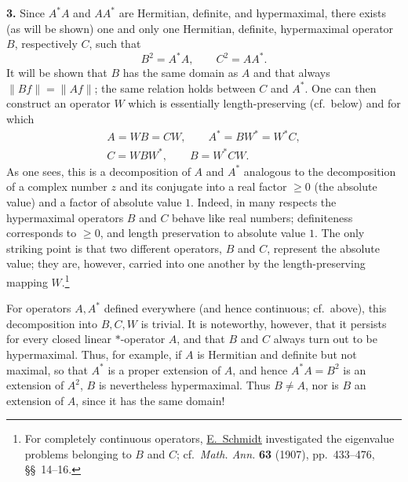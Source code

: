 \documentclass[fontsize=13pt,paper=b5,leqno,bookmarkpackage=false]{scrartcl}
\begin{document}
\label{intro:3}
\noindent\textbf{3.}
Since \(A^*A\) and \(AA^*\) are Hermitian, definite, and hypermaximal,
there exists (as will be shown) one and only one Hermitian, definite,
hypermaximal
operator \(B\), respectively \(C\), such that
\[
  B^2=A^*A,\qquad C^2=AA^*.
\]
It will be shown that \(B\) has the same domain as \(A\) and that always
\(\lVert Bf\rVert=\lVert Af\rVert\); the same relation holds between
\(C\) and \(A^*\). One can then construct an operator \(W\) which is
essentially length-preserving (cf.\ below) and for which
\label{eq:intro-polar-relations}
\begin{equation*}
 \begin{gathered}
   A=WB=CW,\qquad
   A^*=BW^*=W^*C,\\
   C=WBW^*,\qquad
   B=W^*CW .
 \end{gathered}
\end{equation*}
As one sees, this is a decomposition of \(A\) and \(A^*\) analogous to
the decomposition of a complex number \(z\) and its conjugate into a
real factor \(\geq0\) (the absolute value) and a factor of absolute
value \(1\). Indeed, in many respects the hypermaximal operators \(B\)
and \(C\) behave like real numbers; definiteness corresponds to
\(\geq0\), and length preservation to absolute value \(1\). The only
striking point is that two different operators, \(B\) and \(C\),
represent the absolute value; they are, however, carried into one
another by the length-preserving mapping \(W\).\footnote{\label{fn:11}%
For completely continuous operators,
\hypertarget{bib:Schmidt1907}{\href{https://doi.org/10.1007/BF01449770}{%
E.~Schmidt}} investigated the eigenvalue problems belonging to \(B\) and
\(C\); cf.\ \emph{Math. Ann.} \textbf{63} (1907), pp.~433--476,
\S\S~14--16.}

For operators \(A,A^*\) defined everywhere (and hence continuous; cf.\
above), this decomposition into \(B,C,W\) is trivial. It is noteworthy,
however, that it persists for every closed linear \(*\)-operator \(A\),
and that \(B\) and \(C\) always turn out to be hypermaximal. Thus, for
example, if \(A\) is Hermitian and definite but not maximal, so that
\(A^*\) is a proper extension of \(A\), and hence
\(A^*A=B^2\) is an extension of \(A^2\), \(B\) is nevertheless
hypermaximal. Thus \(B\ne A\), nor is \(B\) an extension of \(A\), since
it has the same domain!
\end{document}
